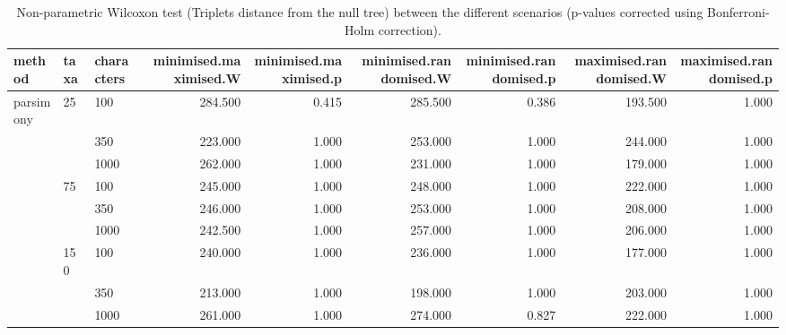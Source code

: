 \begin{table}[ht]
\centering
\begin{tabular}{lllrrrrrr}
  \hline
method & taxa & characters & minimised.maximised.W & minimised.maximised.p & minimised.randomised.W & minimised.randomised.p & maximised.randomised.W & maximised.randomised.p \\ 
  \hline
parsimony & 25 & 100 & 284.500 & 0.415 & 285.500 & 0.386 & 193.500 & 1.000 \\ 
   &  & 350 & 223.000 & 1.000 & 253.000 & 1.000 & 244.000 & 1.000 \\ 
   &  & 1000 & 262.000 & 1.000 & 231.000 & 1.000 & 179.000 & 1.000 \\ 
   & 75 & 100 & 245.000 & 1.000 & 248.000 & 1.000 & 222.000 & 1.000 \\ 
   &  & 350 & 246.000 & 1.000 & 253.000 & 1.000 & 208.000 & 1.000 \\ 
   &  & 1000 & 242.500 & 1.000 & 257.000 & 1.000 & 206.000 & 1.000 \\ 
   & 150 & 100 & 240.000 & 1.000 & 236.000 & 1.000 & 177.000 & 1.000 \\ 
   &  & 350 & 213.000 & 1.000 & 198.000 & 1.000 & 203.000 & 1.000 \\ 
   &  & 1000 & 261.000 & 1.000 & 274.000 & 0.827 & 222.000 & 1.000 \\ 
   \hline
\end{tabular}
\caption{Non-parametric Wilcoxon test (Triplets distance from the null tree) between the different scenarios (p-values corrected using Bonferroni-Holm correction).} 
\label{Full_Tab_Parsimony_WXTrnull}
\end{table}
